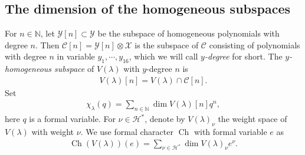 \documentclass[12pt]{article}
\numberwithin{equation}{section}
\theoremstyle{definition}
\theoremstyle{remark}
\begin{document}
\subsection{The dimension of the homogeneous subspaces}
For $n\in\mathbb{N}$, let $\mathscr{Y}[n]\subset\mathscr{Y}$ be the subspace of homogeneous polynomials with degree $n$. Then $\mathscr{C}[n]=\mathscr{Y}[n]\otimes \mathscr{X}$ is the subspace of $\mathscr{C}$ consisting of polynomials with degree $n$ in variable $y_1,\cdots,y_{16}$, which we will call {\it $y$-degree} for short. The {\it $y$-homogeneous subspace} of $V(\lambda)$ with $y$-degree $n$ is 
\begin{eqnarray}
	V(\lambda)[n]=V(\lambda)\cap\mathscr{C}[n].
\end{eqnarray}
Set
\begin{eqnarray}
	\chi_\lambda(q)=\sum_{n\in\mathbb{N}}\dim V(\lambda)[n]q^n, \label{5.2}
\end{eqnarray}
here $q$ is a formal variable. For $\nu\in \mathscr{H}^*$, denote by $V(\lambda)_{\nu}$ the weight space of $V(\lambda)$ with weight $\nu$. We use formal character $\operatorname{Ch}$ with formal variable $e$ as 
\begin{eqnarray}
	\operatorname{Ch}(V(\lambda))(e)=\sum_{\nu\in \mathscr{H}^*}\dim V(\lambda)_\nu e^{\nu}. \label{5.3}
\end{eqnarray}
\end{document}
